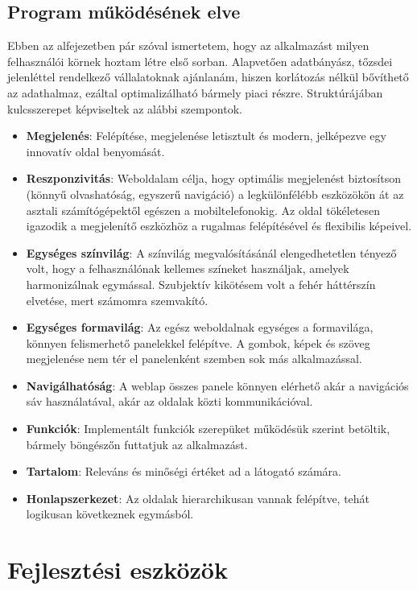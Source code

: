 \subsection{Program működésének elve}

Ebben az alfejezetben pár szóval ismertetem, hogy az alkalmazást milyen felhasználói körnek hoztam létre első sorban. Alapvetően adatbányász, tőzsdei jelenléttel rendelkező vállalatoknak ajánlanám, hiszen korlátozás nélkül bővíthető az adathalmaz, ezáltal optimalizálható bármely piaci részre. Struktúrájában kulcsszerepet képviseltek az alábbi szempontok.

\begin{itemize}
\item \textbf{Megjelenés}: Felépítése, megjelenése letisztult és modern, jelképezve egy innovatív oldal benyomását.
\item \textbf{Reszponzivitás}: Weboldalam célja, hogy optimális megjelenést biztosítson \\
(könnyű olvashatóság, egyszerű navigáció) a legkülönfélébb eszközökön át az asztali számítógépektől egészen a mobiltelefonokig. Az oldal tökéletesen igazodik a megjelenítő eszközhöz a rugalmas felépítésével és flexibilis képeivel.
\item \textbf{Egységes színvilág}: A színvilág megvalósításánál elengedhetetlen tényező volt, hogy a felhasználónak kellemes színeket használjak, amelyek harmonizálnak egymással. Szubjektív kikötésem volt a fehér háttérszín elvetése, mert számomra szemvakító.
\item \textbf{Egységes formavilág}: Az egész weboldalnak egységes a formavilága, könnyen felismerhető panelekkel felépítve. A gombok, képek és szöveg megjelenése nem tér el panelenként szemben sok más alkalmazással.
\item \textbf{Navigálhatóság}: A weblap összes panele könnyen elérhető akár a navigációs sáv használatával, akár az oldalak közti kommunikációval.
\item \textbf{Funkciók}: Implementált funkciók szerepüket működésük szerint betöltik, bármely böngészőn futtatjuk az alkalmazást.
\item \textbf{Tartalom}: Releváns és minőségi értéket ad a látogató számára.
\item \textbf{Honlapszerkezet}: Az oldalak hierarchikusan vannak felépítve, tehát logikusan következnek egymásból.
\end{itemize}

\section{Fejlesztési eszközök}

